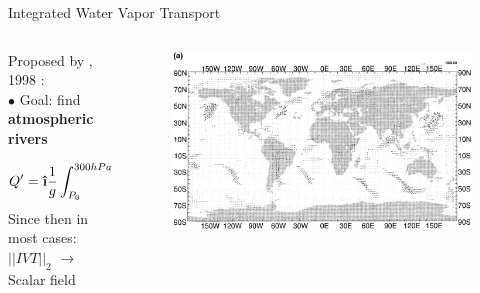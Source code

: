 \begin{frame}{Integrated Water Vapor Transport}

 \begin{columns}
   \begin{column}{0.55\textwidth}
Proposed by \citeauthor{zhu_proposed_1998}, 1998 \cite{zhu_proposed_1998}:\\
       $\bullet$ Goal: find \textbf{atmospheric rivers} 



    $$ 
    Q' = \ihat \frac{1}{g} \displaystyle\int_{P_0}^{300 hPa} \overline{q'u'} dp + \jhat \frac{1}{g} \displaystyle\int_{P_0}^{300 hPa} \overline{q'v'} dp
    $$
Since then in most cases: $||IVT||_2$ $\to$ Scalar field \cite{sousa_north_2020, jiang_impact_2017, ayantobo_integrated_2022, allan_diagnosing_2016, ralph_scale_2019, ralph_dropsonde_2017}
   \end{column}
   \begin{column}{0.45\textwidth}
    \begin{figure}[h]
      \centering
      \includegraphics[width=\columnwidth]{imglib/zhu_ars.png}
    \end{figure}
    
   \end{column}
  
 \end{columns} 
  
  
\end{frame}

